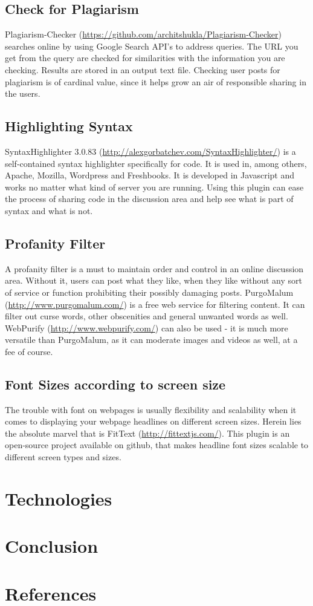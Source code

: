\documentclass[hidelinks, 12pt]{article}
\begin{document}
\subsection{Check for Plagiarism}
Plagiarism-Checker (\url{https://github.com/architshukla/Plagiarism-Checker}) searches online by using Google Search API's to address queries. The URL you get from the query are checked for similarities with the information you are checking. Results are stored in an output text file. Checking user posts for plagiarism is of cardinal value, since it helps grow an air of responsible sharing in the users.
\subsection{Highlighting Syntax}
SyntaxHighlighter 3.0.83 (\url{http://alexgorbatchev.com/SyntaxHighlighter/}) is a self-contained syntax highlighter specifically for code. It is used in, among others, Apache, Mozilla, Wordpress and Freshbooks. It is developed in Javascript and works no matter what kind of server you are running. Using this plugin can ease the process of sharing code in the discussion area and help see what is part of syntax and what is not.
\subsection{Profanity Filter}
A profanity filter is a must to maintain order and control in an online discussion area. Without it, users can post what they like, when they like without any sort of service or function prohibiting their possibly damaging posts. PurgoMalum (\url{http://www.purgomalum.com/}) is a free web service for filtering content. It can filter out curse words, other obscenities and general unwanted words as well. WebPurify (\url{http://www.webpurify.com/}) can also be used - it is much more versatile than PurgoMalum, as it can moderate images and videos as well, at a fee of course.
\subsection{Font Sizes according to screen size}
The trouble with font on webpages is usually flexibility and scalability when it comes to displaying your webpage headlines on different screen sizes. Herein lies the absolute marvel that is FitText (\url{http://fittextjs.com/}). This plugin is an open-source project available on github, that makes headline font sizes scalable to different screen types and sizes.

\section{Technologies}

\section{Conclusion}

\section{References}
\end{document}
